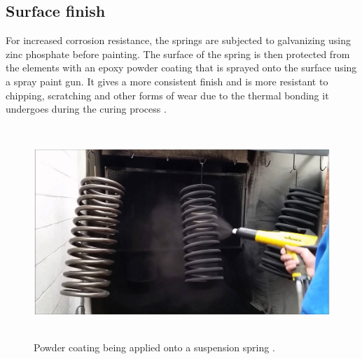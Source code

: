 \documentclass[11pt]{article}
\begin{document}
\subsection{Surface finish}
For increased corrosion resistance, the springs are subjected to galvanizing using zinc phosphate before painting. The surface of the spring is then protected from the elements with an epoxy powder coating that is sprayed onto the surface using a spray paint gun. It gives a more consistent finish and is more resistant to chipping, scratching and other forms of wear due to the thermal bonding it undergoes during the curing process \cite{b8}.
\begin{figure}[H]
    \centering
    \includegraphics[height = 8cm]{./img/spray1.png}
    \caption{Powder coating being applied onto a suspension spring \cite{b9}.}
    \label{fig:spray1}
\end{figure}
\end{document}
